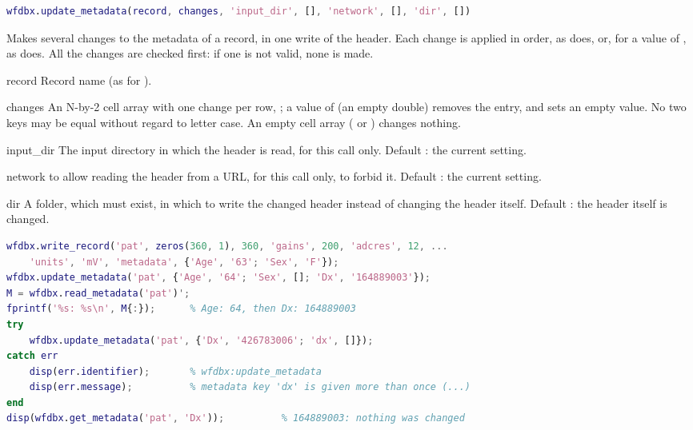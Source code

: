 \begin{lstlisting}[language=Matlab,style=signature]
wfdbx.update_metadata(record, changes, 'input_dir', [], 'network', [], 'dir', [])
\end{lstlisting}
Makes several changes to the metadata of a record, in one write of the header. Each
change is applied in order, as  does, or, for a value of
\code{[]}, as  does. All the changes are checked first: if one
is not valid, none is made.
\begin{params}
\item[record] Record name (as for ).
\item[changes] An N-by-2 cell array with one change per row, ;
  a value of \code{[]} (an empty double) removes the entry, and  sets an empty
  value. No two keys may be equal without regard to letter case. An empty cell array
  (\code{\{\}} or ) changes nothing.
\item[input\_dir] The input directory in which the header is read, for this call only.
  Default \code{[]}: the current setting.
\item[network]  to allow reading the header from a URL, for this call only,
   to forbid it. Default \code{[]}: the current setting.
\item[dir] A folder, which must exist, in which to write the changed header instead of
  changing the header itself. Default \code{[]}: the header itself is changed.
\end{params}
\begin{lstlisting}[language=Matlab,style=example]
wfdbx.write_record('pat', zeros(360, 1), 360, 'gains', 200, 'adcres', 12, ...
    'units', 'mV', 'metadata', {'Age', '63'; 'Sex', 'F'});
wfdbx.update_metadata('pat', {'Age', '64'; 'Sex', []; 'Dx', '164889003'});
M = wfdbx.read_metadata('pat')';
fprintf('%s: %s\n', M{:});      % Age: 64, then Dx: 164889003
try
    wfdbx.update_metadata('pat', {'Dx', '426783006'; 'dx', []});
catch err
    disp(err.identifier);       % wfdbx:update_metadata
    disp(err.message);          % metadata key 'dx' is given more than once (...)
end
disp(wfdbx.get_metadata('pat', 'Dx'));          % 164889003: nothing was changed
\end{lstlisting}

